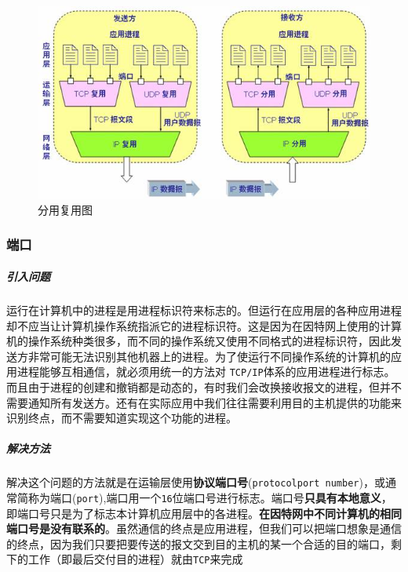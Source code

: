 \documentclass[UTF8,a4paper,8pt]{ctexbook}
\begin{document}
				\begin{figure}[h]
					\centering
					\includegraphics[scale = 0.8]{TCP-MM.jpg}
					\caption{分用复用图}
					\label{MM}
				\end{figure}
	
			\subsubsection{端口}
				\subparagraph{引入问题}
					运行在计算机中的进程是用进程标识符来标志的。但运行在应用层的各种应用进程却不应当让计算机操作系统指派它的进程标识符。这是因为在因特网上使用的计算机的操作系统种类很多，而不同的操作系统又使用不同格式的进程标识符，因此发送方非常可能无法识别其他机器上的进程。为了使运行不同操作系统的计算机的应用进程能够互相通信，就必须用统一的方法对 \verb|TCP/IP|体系的应用进程进行标志。而且由于进程的创建和撤销都是动态的，有时我们会改换接收报文的进程，但并不需要通知所有发送方。还有在实际应用中我们往往需要利用目的主机提供的功能来识别终点，而不需要知道实现这个功能的进程。
				
				\subparagraph{解决方法}
					解决这个问题的方法就是在运输层使用\textbf{协议端口号}(\verb|protocolport number|)，或通常简称为端口(\verb|port|),端口用一个\verb|16|位端口号进行标志。端口号\textbf{只具有本地意义}，即端口号只是为了标志本计算机应用层中的各进程。\textbf{在因特网中不同计算机的相同端口号是没有联系的}。虽然通信的终点是应用进程，但我们可以把端口想象是通信的终点，因为我们只要把要传送的报文交到目的主机的某一个合适的目的端口，剩下的工作（即最后交付目的进程）就由\verb|TCP|来完成
				
\end{document}
